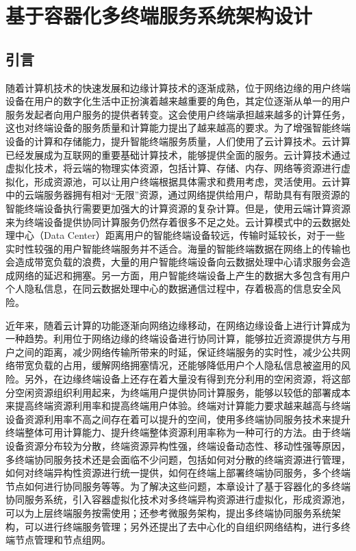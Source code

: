 \chapter{基于容器化多终端服务系统架构设计 }\label{chap:service_system}

\section{引言}
随着计算机技术的快速发展和边缘计算技术的逐渐成熟，位于网络边缘的用户终端设备在用户的数字化生活中正扮演着越来越重要的角色，其定位逐渐从单一的用户服务发起者向用户服务的提供者转变。这会使用户终端承担越来越多的计算任务，这也对终端设备的服务质量和计算能力提出了越来越高的要求。为了增强智能终端设备的计算和存储能力，提升智能终端服务质量，人们使用了云计算技术\cite{ma2013mobile,qi2012research,othman2014survey,liu2013gearing}。云计算已经发展成为互联网的重要基础计算技术，能够提供全面的服务\cite{luan2015fog}。云计算技术通过虚拟化技术，将云端的物理实体资源，包括计算、存储、内存、网络等资源进行虚拟化，形成资源池，可以让用户终端根据具体需求和费用考虑，灵活使用。云计算中的云端服务器拥有相对“无限”资源，通过网络提供给用户，帮助具有有限资源的智能终端设备执行需要更加强大的计算资源的复杂计算\citep{Noor.2018}。但是，使用云端计算资源来为终端设备提供协同计算服务仍然存着很多不足之处。云计算模式中的云数据处理中心（Data Center）距离用户的智能终端设备较远，传输时延较长，对于一些实时性较强的用户智能终端服务并不适合。海量的智能终端数据在网络上的传输也会造成带宽负载的浪费，大量的用户智能终端设备向云数据处理中心请求服务会造成网络的延迟和拥塞\citep{mao2016dynamic,Ismail2016Evaluation}。另一方面，用户智能终端设备上产生的数据大多包含有用户个人隐私信息，在同云数据处理中心的数据通信过程中，存着极高的信息安全风险\cite{sun2016edgeiot}。

近年来，随着云计算的功能逐渐向网络边缘移动，在网络边缘设备上进行计算成为一种趋势\cite{mao2017survey}。利用位于网络边缘的终端设备进行协同计算，能够拉近资源提供方与用户之间的距离，减少网络传输所带来的时延，保证终端服务的实时性，减少公共网络带宽负载的占用，缓解网络拥塞情况，还能够降低用户个人隐私信息被盗用的风险。另外，在边缘终端设备上还存在着大量没有得到充分利用的空闲资源，将这部分空闲资源组织利用起来，为终端用户提供协同计算服务，能够以较低的部署成本来提高终端资源利用率和提高终端用户体验。终端对计算能力要求越来越高与终端设备资源利用率不高之间存在着可以提升的空间，使用多终端协同服务技术来提升终端整体可用计算能力、提升终端整体资源利用率称为一种可行的方法。由于终端设备资源分布较为分散，终端资源异构性强，终端设备动态性、移动性强等原因，多终端协同服务技术还是会面临不少问题，包括如何对分散的终端资源进行管理，如何对终端异构性资源进行统一提供，如何在终端上部署终端协同服务，多个终端节点如何进行协同服务等等。为了解决这些问题，本章设计了基于容器化的多终端协同服务系统，引入容器虚拟化技术对多终端异构资源进行虚拟化，形成资源池，可以为上层终端服务按需使用；还参考微服务架构，提出多终端协同服务系统架构，可以进行终端服务管理；另外还提出了去中心化的自组织网络结构，进行多终端节点管理和节点组网。

